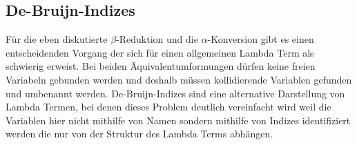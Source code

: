 \documentclass[ngerman]{article}
\begin{document}
\subsection{De-Bruijn-Indizes}

Für die eben diskutierte $\beta$-Reduktion und die $\alpha$-Konversion gibt es einen entscheidenden Vorgang der sich für einen allgemeinen Lambda Term als schwierig erweist.
Bei beiden Äquivalentumformungen dürfen keine freien Variabeln gebunden werden und deshalb müssen kollidierende Variablen gefunden und umbenannt werden.
De-Bruijn-Indizes sind eine alternative Darstellung von Lambda Termen, bei denen dieses Problem deutlich vereinfacht wird weil die Variablen hier nicht mithilfe von Namen sondern mithilfe von Indizes identifiziert werden die nur von der Struktur des Lambda Terms abhängen.
\end{document}

